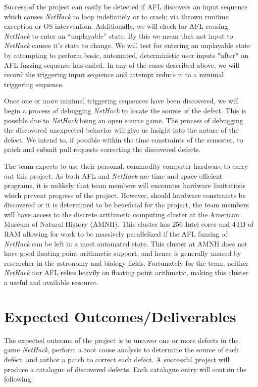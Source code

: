 \documentclass[12pt]{diazessay}
\begin{document}
Success of the project can easily be detected if AFL discovers an input sequence which causes \emph{NetHack} to loop indefinitely or to crash; via thrown runtime exception or OS intervention.
Additionally, we will check for AFL causing \emph{NetHack} to enter an ``unplayable'' state.
By this we mean that not input to \emph{NetHack} causes it's state to change.
We will test for entering an unplayable state by attempting to perform basic, automated, deterministic user inputs *after* an AFL fuzzing sequence has ended.
In any of the cases described above, we will record the triggering input sequence and attempt reduce it to a minimal triggering sequence.

Once one or more minimal triggering sequences have been discovered, we will begin a process of debugging \emph{NetHack} to locate the source of the defect.
This is possible due to \emph{NetHack} being an open source game.
The process of debugging the discovered unexpected behavior will give us insight into the nature of the defect.
We intend to, if possible within the time constraints of the semester, to patch and submit pull requests correcting the discovered defects.

The team expects to use their personal, commodity computer hardware to carry out this project.
As both AFL and \emph{NetHack} are time and space efficient programs, it is unlikely that team members will encounter hardware limitations which prevent progress of the project.
However, should hardware constraints be discovered or it is determined to be beneficial for the project, the team members will have access to the discrete arithmetic computing cluster at the American Museum of Natural History (AMNH).
This cluster has 256 Intel cores and 4TB of RAM allowing for work to be massively parallelized if the AFL fuzzing of \emph{NetHack} can be left in a most automated state.
This cluster at AMNH does not have good floating point arithmetic support, and hence is generally unused by researcher in the astronomy and biology fields.
Fortunately for the team, neither \emph{NetHack} nor AFL relies heavily on floating point arithmetic, making this cluster a useful and available resource.



\section*{Expected Outcomes/Deliverables}

The expected outcome of the project is to uncover one or more defects in the game \emph{NetHack}, perform a root cause analysis to determine the source of each defect, and author a patch to correct each defect. 
A successful project will produce a catalogue of discovered defects. 
Each catalogue entry will contain the following: 
\end{document}
